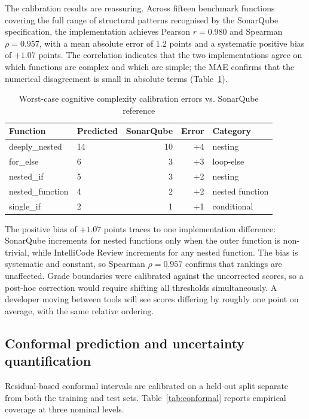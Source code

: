 \documentclass[12pt, oneside]{report}
\begin{document}
The calibration results are reassuring. Across fifteen benchmark functions covering
the full range of structural patterns recognised by the SonarQube specification, the
implementation achieves Pearson $r = 0.980$ and Spearman $\rho = 0.957$, with a mean
absolute error of 1.2 points and a systematic positive bias of $+1.07$ points. The
correlation indicates that the two implementations agree on which functions are complex
and which are simple; the MAE confirms that the numerical disagreement is small in
absolute terms (Table~\ref{tab:ccval}).

\begin{table}[H]
\centering
\caption{Worst-case cognitive complexity calibration errors vs. SonarQube reference}
\label{tab:ccval}
\begin{tabular}{@{}llrrl@{}}
\toprule
\textbf{Function} & \textbf{Predicted} & \textbf{SonarQube} & \textbf{Error} & \textbf{Category} \\
\midrule
deeply\_nested  & 14 & 10 & +4 & nesting \\
for\_else       &  6 &  3 & +3 & loop-else \\
nested\_if      &  5 &  3 & +2 & nesting \\
nested\_function &  4 &  2 & +2 & nested function \\
single\_if      &  2 &  1 & +1 & conditional \\
\bottomrule
\end{tabular}
\end{table}

The positive bias of $+1.07$ points traces to one implementation difference: SonarQube increments for nested functions only when the outer function is non-trivial, while IntelliCode Review increments for any nested function. The bias is systematic and constant, so Spearman $\rho = 0.957$ confirms that rankings are unaffected. Grade boundaries were calibrated against the uncorrected scores, so a post-hoc correction would require shifting all thresholds simultaneously. A developer moving between tools will see scores differing by roughly one point on average, with the same relative ordering.

\subsection{Conformal prediction and uncertainty quantification}

Residual-based conformal intervals are calibrated on a held-out split separate from
both the training and test sets. Table~\ref{tab:conformal} reports empirical coverage
at three nominal levels.
\end{document}
